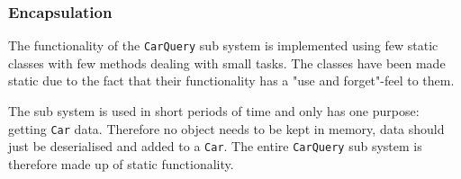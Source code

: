 \subsubsection{Encapsulation}
The functionality of the \texttt{CarQuery} sub system is implemented using few static classes with few methods dealing with small tasks. The classes have been made static due to the fact that their functionality has a "use and forget"-feel to them. 

The sub system is used in short periods of time and only has one purpose: getting \texttt{Car} data. Therefore no object needs to be kept in memory, data should just be deserialised and added to a \texttt{Car}. The entire \texttt{CarQuery} sub system is therefore made up of static functionality.

